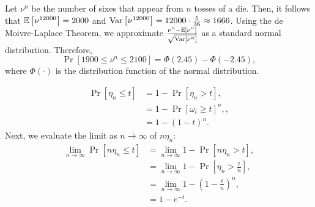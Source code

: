 \begin{problem}{5}
\end{problem}
\begin{solution}
    Let $\nu^n$ be the number of sixes that appear from $n$ tosses of a die. Then, it follows that $\mathbb{E}\left[\nu^{12000}\right] = 2000$ and $\operatorname{Var}\left[{\nu^{12000}}\right] = 12000\cdot\frac{5}{36} \approx 1666$. Using the de Moivre-Laplace Theorem, we approximate $\frac{\nu^n - \mathbb{E}\left[\nu^n\right]}{\sqrt{\operatorname{Var}[\nu^n]}}$ as a standard normal distribution. Therefore,
    \[\Pr[1900 \leq \nu^n \leq 2100] = \Phi(2.45) - \Phi(-2.45),\]
    where $\Phi(\cdot)$ is the distribution function of the normal distribution.
\end{solution}
\begin{problem}{6}
\end{problem}
\begin{solution}
    \begin{align*}
        \Pr[\eta_n \leq t] &= 1 - \Pr[\eta_n > t], \\
        &= 1 - \Pr[\omega_i \geq t]^n, \tag{by i.i.d.}, \\
        &= 1 - (1-t)^n.
    \end{align*}
    Next, we evaluate the limit as $n\to\infty$ of $n\eta_n$:
    \begin{align*}
        \lim_{n\to\infty} \Pr[n\eta_n \leq t] &= \lim_{n\to\infty} 1 - \Pr[n\eta_n > t], \\
        &= \lim_{n\to\infty} 1 - \Pr\left[\eta_n > \frac{t}{n}\right], \\
        &= \lim_{n\to\infty} 1 - \left(1 - \frac{t}{n}\right)^n, \\
        &= 1-e^{-t}.
    \end{align*}
\end{solution}
\begin{problem}{7}
    
\end{problem}
\begin{solution}
    
\end{solution}
\begin{problem}{8}
\end{problem}
\begin{solution}
    
\end{solution}

